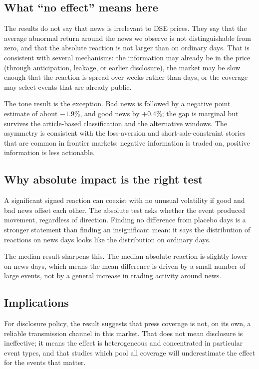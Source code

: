 \documentclass[10pt,twocolumn,a4paper]{article}
\begin{document}
\subsection{What ``no effect'' means here}

The results do not say that news is irrelevant to DSE prices. They say that the average abnormal return
around the news we observe is not distinguishable from zero, and that the absolute reaction is not
larger than on ordinary days. That is consistent with several mechanisms: the information may already be
in the price (through anticipation, leakage, or earlier disclosure), the market may be slow enough that
the reaction is spread over weeks rather than days, or the coverage may select events that are already
public.

The tone result is the exception. Bad news is followed by a negative point estimate of about
$-1.9\%$, and good news by $+0.4\%$; the gap is marginal but survives the article-based classification
and the alternative windows. The asymmetry is consistent with the loss-aversion and short-sale-constraint
stories that are common in frontier markets: negative information is traded on, positive information is
less actionable.

\subsection{Why absolute impact is the right test}

A significant signed reaction can coexist with no unusual volatility if good and bad news offset each
other. The absolute test asks whether the event produced movement, regardless of direction. Finding no
difference from placebo days is a stronger statement than finding an insignificant mean: it says the
distribution of reactions on news days looks like the distribution on ordinary days.

The median result sharpens this. The median absolute reaction is slightly lower on news days, which
means the mean difference is driven by a small number of large events, not by a general increase in
trading activity around news.

\subsection{Implications}

For disclosure policy, the result suggests that press coverage is not, on its own, a reliable
transmission channel in this market. That does not mean disclosure is ineffective; it means the effect
is heterogeneous and concentrated in particular event types, and that studies which pool all coverage
will underestimate the effect for the events that matter.
\end{document}
